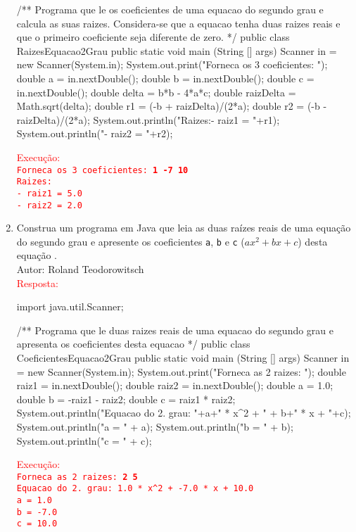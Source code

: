 \documentclass[onecolumn,a4paper,10pt]{report}
\newcommand{\+}{\, + \,}
\newcommand{\<}{\hspace*{-0.4cm}}
\begin{document}
\begin{enumerate}[1.]
\begin{javacode}
/**
   Programa que le os coeficientes de uma equacao do segundo grau e
   calcula as suas raizes. Considera-se que a equacao tenha duas
   raizes reais e que o primeiro coeficiente seja diferente de zero.
*/
public class RaizesEquacao2Grau {
    public static void main (String [] args) {
        Scanner in = new Scanner(System.in);
        System.out.print("Forneca os 3 coeficientes: ");
        double a = in.nextDouble();
        double b = in.nextDouble();
        double c = in.nextDouble();
        double delta = b*b - 4*a*c;
        double raizDelta = Math.sqrt(delta);
        double r1 = (-b + raizDelta)/(2*a);
        double r2 = (-b - raizDelta)/(2*a);
        System.out.println("Raizes:\n- raiz1 = "+r1);
        System.out.println("- raiz2 = "+r2);
    }
}
\end{javacode}
\textcolor{red}{Execução:\\
\texttt{Forneca os 3 coeficientes: \textbf{1 -7 10}\\
Raizes:\\
- raiz1 = 5.0\\
- raiz2 = 2.0}
}

\item Construa um programa em Java que leia as duas raízes reais de uma equação do segundo grau e apresente os coeficientes \texttt{a}, \texttt{b} e \texttt{c} ($ax^2+bx+c$) desta equação .\\
{\tiny Autor: Roland Teodorowitsch}\\
\textcolor{red}{Resposta:}\\
\begin{javacode}
import java.util.Scanner;

/**
   Programa que le duas raizes reais de uma equacao do segundo grau e
   apresenta os coeficientes desta equacao
*/
public class CoeficientesEquacao2Grau {
    public static void main (String [] args) {
        Scanner in = new Scanner(System.in);
        System.out.print("Forneca as 2 raizes: ");
        double raiz1 = in.nextDouble();
        double raiz2 = in.nextDouble();
        double a = 1.0;
        double b = -raiz1 - raiz2;
        double c = raiz1 * raiz2;
        System.out.println("Equacao do 2. grau: "+a+" * x^2 + " + b+" * x + "+c);
        System.out.println("a = " + a);
        System.out.println("b = " + b);
        System.out.println("c = " + c);
    }
}
\end{javacode}
\textcolor{red}{Execução:\\
\texttt{Forneca as 2 raizes: \textbf{2 5}\\
Equacao do 2. grau: 1.0 * x\textasciicircum 2 + -7.0 * x + 10.0\\
a = 1.0\\
b = -7.0\\
c = 10.0}
}


\end{enumerate}
\end{document}
